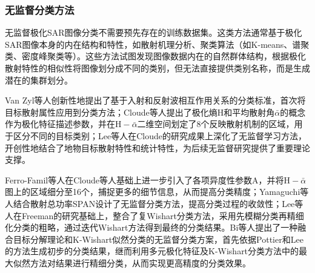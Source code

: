 \subsubsection{无监督分类方法}
无监督极化SAR图像分类不需要预先存在的训练数据集。这类方法通常基于极化SAR图像本身的内在结构和特性，如散射机理分析、聚类算法（如K-means、谱聚类、密度峰聚类等）。这些方法试图发现图像数据内在的自然群体结构，根据极化散射特性的相似性将图像划分成不同的类别，但无法直接提供类别名称，而是生成潜在的集群划分。

Van Zyl等人创新性地提出了基于入射和反射波相互作用关系的分类标准，首次将目标散射属性应用到分类方法；Cloude等人提出了极化熵$\mathrm{H}$和平均散射角$\bar{\alpha}$的概念作为极化特征描述参数，并在$\mathrm{H}-\bar{\alpha}$二维空间划定了8个反映散射机制的区域，用于区分不同的目标类别；Lee等人在Cloude的研究成果上深化了无监督学习方法，开创性地结合了地物目标散射特性和统计特性，为后续无监督研究提供了重要理论支撑。


Ferro-Famil等人在Cloude等人基础上进一步引入了各项异度性参数$\mathrm{A}$，并将$\mathrm{H}-\bar{\alpha}$图上的区域细分至16个，捕捉更多的细节信息，从而提高分类精度；Yamaguchi等人结合散射总功率SPAN设计了无监督分类方法，提高分类过程的收敛性；Lee等人在Freeman的研究基础上，整合了复Wishart分类方法，采用先模糊分类再精细化分类的粗略，通过迭代Wishart方法得到最终的分类结果。Bi等人提出了一种融合目标分解理论和K-Wishart似然分类的无监督分类方案，首先依据Pottier和Lee的方法生成初步的分类结果，继而利用多元极化特征及K-Wishart分类方法中的最大似然方法对结果进行精细分类，从而实现更高精度的分类效果。


